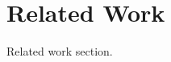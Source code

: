 \ifx\mainfile\undefined

\setcounter{chapter}{8} %
\fi

\cleardoublepage
\chapter{Related Work}
\label{chap:related}

Related work section.

\ifx\mainfile\undefined

\fi
